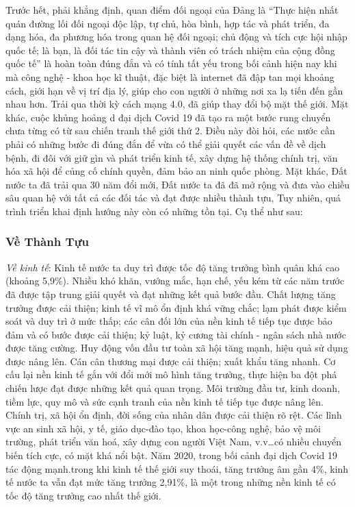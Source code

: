 \documentclass[12pt]{article}
\begin{document}
Trước hết, phải khẳng định, quan điểm đối ngoại của Đảng là ``Thực
hiện nhất quán đường lối đối ngoại độc lập, tự chủ, hòa bình,
hợp tác và phát triển, đa dạng hóa, đa phương hóa trong quan hệ đối
ngoại; chủ động và tích cực hội nhập quốc tế; là bạn,
là đối tác tin cậy và thành viên có trách nhiệm của cộng đồng quốc
tế'' là hoàn toàn đúng đắn và có tính tất yếu trong bối cảnh hiện nay khi mà
công nghệ - khoa học kĩ thuật, đặc biệt là internet đã đập tan mọi khoảng
cách, giới hạn về vị trí địa lý, giúp cho con người ở những nơi xa
lạ tiến đến gần nhau hơn. Trải qua thời kỳ cách mạng 4.0,
đã giúp thay đổi bộ mặt thế giới. Mặt khác, cuộc khủng hoảng d
đại dịch Covid 19 đã tạo ra một bước rung chuyển chưa từng
có từ sau chiến tranh thế giới thứ 2. Điều này đòi hỏi, các nước
cần phải có những bước đi đúng đắn để vừa có thể giải quyết các vấn đề
về dịch bệnh, đi đôi với giữ gìn và phát triển kinh tế, xây dựng hệ thống
chính trị, văn hóa xã hội để củng cố chính quyền, đảm bảo an ninh quốc
phòng. Mặt khác, Đất nước ta đã trải qua 30 năm đổi mới, Đất nước ta đã đã
mở rộng và đưa vào chiều sâu quan hệ với tất cả các đối tác và
đạt được nhiều thành tựu, Tuy nhiên, quá trình triển khai định hướng
này còn có những tồn tại. Cụ thể như sau:
\subsubsection{Về Thành Tựu}
\textit{Về kinh tế}: Kinh tế nước ta duy trì được tốc độ tăng trưởng bình quân khá
cao (khoảng 5,9\%). Nhiều khó khăn, vướng mắc, hạn chế, yếu kém từ
các năm trước đã được tập trung giải quyết và đạt những kết quả bước
đầu. Chất lượng tăng trưởng được cải thiện; kinh tế vĩ mô ổn định khá vững
chắc; lạm phát được kiểm soát và duy trì ở mức thấp; các cân đối lớn của
nền kinh tế tiếp tục được bảo đảm và có bước được cải thiện; kỷ luật, kỷ
cương tài chính - ngân sách nhà nước được tăng cường. Huy động vốn
đầu tư toàn xã hội tăng mạnh, hiệu quả sử dụng được nâng lên.
Cán cân thương mại được cải thiện; xuất khẩu tăng nhanh. Cơ cấu lại
nền kinh tế gắn với đổi mới mô hình tăng trưởng, thực hiện ba đột phá
chiến lược đạt được những kết quả quan trọng. Môi trường đầu tư,
kinh doanh, tiềm lực, quy mô và sức cạnh tranh của nền kinh tế tiếp tục
được nâng lên. Chính trị, xã hội ổn định, đời sống của nhân dân được cải
thiện rõ rệt. Các lĩnh vực an sinh xã hội, y tế, giáo dục-đào tạo,
khoa học-công nghệ, bảo vệ môi trường, phát triển văn hoá, xây dựng con người
Việt Nam, v.v\ldots có nhiều chuyển biến tích cực, có mặt khá nổi bật. Năm 2020,
trong bối cảnh đại dịch Covid 19 tác động mạnh.trong khi kinh
tế thế giới suy thoái, tăng trưởng âm gần 4\%, kinh tế nước ta vẫn
đạt mức tăng trưởng 2,91\%, là một trong những nền kinh tế có tốc
độ tăng trưởng cao nhất thế giới.
\end{document}
